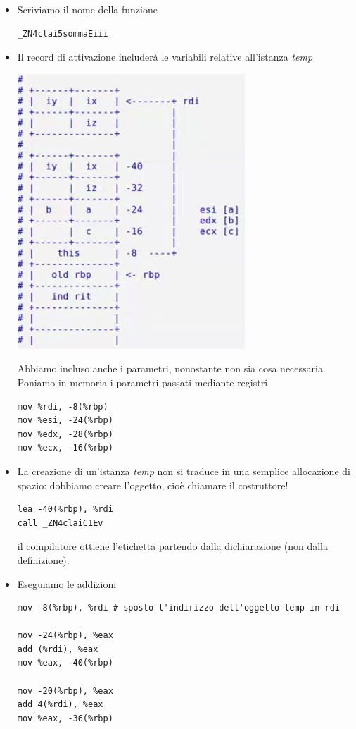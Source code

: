 \documentclass[11pt]{report}
\theoremstyle{definition}
\begin{document}
\begin{itemize}
\item Scriviamo il nome della funzione
\begin{verbatim}
_ZN4clai5sommaEiii
\end{verbatim}
\item Il record di attivazione includerà le variabili relative all'istanza \emph{temp}
\begin{center}
\includegraphics{img/41.PNG}
\end{center}  
Abbiamo incluso anche i parametri, nonostante non sia cosa necessaria. Poniamo in memoria i parametri passati mediante registri
\begin{verbatim}
mov %rdi, -8(%rbp)
mov %esi, -24(%rbp)
mov %edx, -28(%rbp)
mov %ecx, -16(%rbp)
\end{verbatim}
\item La creazione di un'istanza \emph{temp} non si traduce in una semplice allocazione di spazio: dobbiamo creare l'oggetto, cioè chiamare il costruttore!
\begin{verbatim}
lea -40(%rbp), %rdi
call _ZN4claiC1Ev
\end{verbatim}
il compilatore ottiene l'etichetta partendo dalla dichiarazione (non dalla definizione).
\item Eseguiamo le addizioni
\begin{verbatim}
mov -8(%rbp), %rdi # sposto l'indirizzo dell'oggetto temp in rdi
     
mov -24(%rbp), %eax 
add (%rdi), %eax 
mov %eax, -40(%rbp)
     
mov -20(%rbp), %eax
add 4(%rdi), %eax 
mov %eax, -36(%rbp) 
     

\end{verbatim}
\end{itemize}
\end{document}
